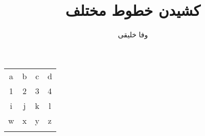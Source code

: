 \documentclass{article}
\title{کشیدن خطوط مختلف}
\author{وفا خلیقی}
\begin{document}
\begin{tabular}{||cc||c|c||}
\hhline{|t:==:t:==:t|}
a&b&c&d\\
\hhline{|:==:|~|~||}
1&2&3&4\\
\hhline{#==#~|=#}
i&j&k&l\\
\hhline{||--||--||}
w&x&y&z\\
\hhline{|b:==:b:==:b|}
\end{tabular}
\end{document}
